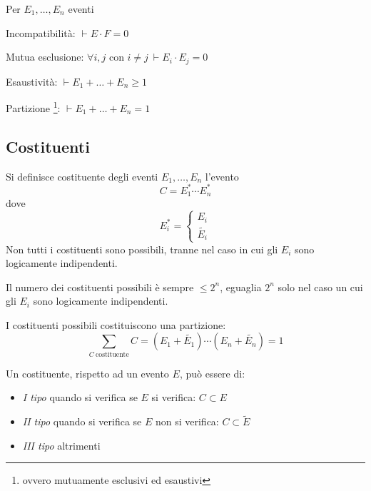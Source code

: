 \begin{definition}
  Per \( E_1, \ldots, E_n \) eventi

  Incompatibilità:
  \( \vdash E \cdot F = 0 \)

  Mutua esclusione:
  \( \forall i, j \text{ con } i \neq j ~ \vdash E_i \cdot E_j = 0 \)

  Esaustività:
  \( \vdash E_1 + \ldots + E_n \geq 1 \)

  Partizione
  \footnote{ovvero mutuamente esclusivi ed esaustivi}:
  \( \vdash E_1 + \ldots + E_n = 1 \)
\end{definition}

\subsection{Costituenti} %
\begin{definition}[Costituente]
  Si definisce costituente degli eventi \( E_1, \ldots, E_n \) l'evento
  \[ C = E_1^* \cdots E_n^* \]
  dove
  \begin{equation*}
    E_i^* =
    \begin{cases}
      E_i \\
      \tilde{E_i}
    \end{cases}
  \end{equation*}
  Non tutti i costituenti sono possibili, tranne nel caso in cui gli $E_i$ sono logicamente indipendenti.
\end{definition}

Il numero dei costituenti possibili è sempre \( \leq 2^n \), eguaglia \( 2^n \) solo nel caso un cui gli $E_i$ sono logicamente indipendenti.

I costituenti possibili costituiscono una partizione:
\[ \sum_{C ~ \text{costituente}} C = (E_1 + \tilde{E_1}) \cdots (E_n + \tilde{E_n}) = 1\]

\begin{definition}
  Un costituente, rispetto ad un evento $E$, può essere di:
  \begin{itemize}
  \item \emph{I tipo} quando si verifica se $E$ si verifica: \( C \subset E \)
  \item \emph{II tipo} quando si verifica se $E$ non si verifica: \( C \subset \tilde{E} \)
  \item \emph{III tipo} altrimenti
  \end{itemize}
\end{definition}

